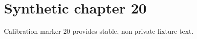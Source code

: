 \chapter{Synthetic chapter 20}\label{chap:20}
Calibration marker 20 provides stable, non-private fixture text.
